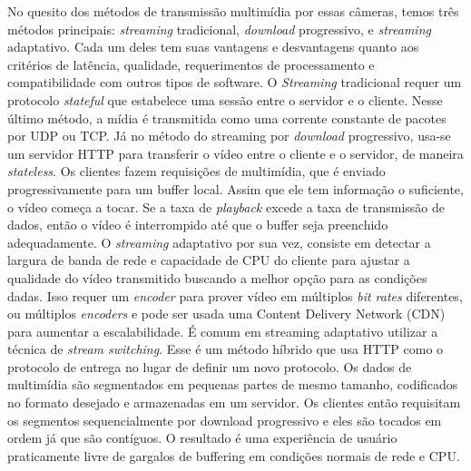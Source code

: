 \documentclass[12pt, %
openright, 
oneside, %
a4paper,    %
brazil]{facom-ufu-abntex2}
\begin{document}
No quesito dos métodos de transmissão multimídia por essas câmeras, temos três
métodos principais: \textit{\foreignlanguage{english}{streaming}} tradicional,
\textit{\foreignlanguage{english}{download}} progressivo, e
\textit{\foreignlanguage{english}{streaming}} adaptativo. Cada um deles tem
suas vantagens e desvantagens quanto aos critérios de latência, qualidade,
requerimentos de processamento e compatibilidade com outros tipos de software.
O \textit{\foreignlanguage{english}{Streaming}} tradicional requer um protocolo
\textit{\foreignlanguage{english}{stateful}} que estabelece uma sessão entre o
servidor e o cliente. Nesse último método, a mídia é transmitida como uma
corrente constante de pacotes por UDP ou TCP.
Já no método do streaming por \textit{\foreignlanguage{english}{download}}
progressivo, usa-se um servidor HTTP para transferir o vídeo entre o cliente e
o servidor, de maneira \textit{\foreignlanguage{english}{stateless}}. Os
clientes fazem requisições de multimídia, que é enviado progressivamente para
um buffer local. Assim que ele tem informação o suficiente, o vídeo começa a
tocar. Se a taxa de \textit{\foreignlanguage{english}{playback}} excede a taxa
de transmissão de dados, então o vídeo é interrompido até que o buffer seja
preenchido adequadamente. O \textit{\foreignlanguage{english}{streaming}}
adaptativo por sua vez, consiste em detectar a largura de banda de rede e
capacidade de CPU do cliente para ajustar a qualidade do vídeo transmitido
buscando a melhor opção para as condições dadas. Isso requer um
\textit{\foreignlanguage{english}{encoder}} para prover vídeo em múltiplos
\textit{\foreignlanguage{english}{bit rates}} diferentes, ou múltiplos
\textit{\foreignlanguage{english}{encoders}} e pode ser usada uma Content
Delivery Network (CDN) para aumentar a escalabilidade. É comum em streaming
adaptativo utilizar a técnica de \textit{\foreignlanguage{english}{stream
		switching}}. Esse é um método híbrido que usa HTTP como o protocolo de entrega
no lugar de definir um novo protocolo. Os dados de multimídia são segmentados
em pequenas partes de mesmo tamanho, codificados no formato desejado e
armazenadas em um servidor. Os clientes então requisitam os segmentos
sequencialmente por download progressivo e eles são tocados em ordem já que são
contíguos. O resultado é uma experiência de usuário praticamente livre de
gargalos de buffering em condições normais de rede e CPU.
\end{document}
